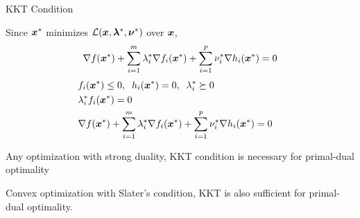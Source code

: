 \documentclass[handout,fleqn,aspectratio=169]{beamer}
\begin{document}
\begin{frame}{KKT Condition}

\plitemsep 0.05in
\bci 

\item Since $\bm{x}^{*}$ minimizes ${\cal L}(\bm{x},\bm{\lambda}^{*},\bm{\nu}^{*})$ over $\bm{x}$, 
\[
\nabla f(\bm{x}^{*}) + \sum_{i=1}^{m}\lambda_{i}^{*}\nabla
f_{i}(\bm{x}^{*}) + \sum_{i=1}^{p}\nu_{i}^{*}\nabla h_{i}(\bm{x}^{*}) = 0
\]
\vspace{-0.3cm}
{
\vspace{-0.3cm}
\begin{eqnarray*}
& f_{i}(\bm{x}^{*})\leq 0, \;\; h_{i}(\bm{x}^{*})=0, \;\;
\lambda_{i}^{*}\succeq 0 & \\
& \lambda_{i}^{*}f_{i}(\bm{x}^{*}) = 0 &\\
& \nabla f(\bm{x}^{*}) + \sum_{i=1}^{m}\lambda_{i}^{*}\nabla f_{i}(\bm{x}^{*}) + \sum_{i=1}^{p}\nu_{i}^{*}\nabla h_{i}(\bm{x}^{*}) = 0 &
\end{eqnarray*}
\vspace{-0.3cm}
}

\item {\red Any} optimization  with strong duality, KKT condition is necessary for primal-dual optimality

\item {\red Convex} optimization with Slater's condition, KKT is
also {\red sufficient} for primal-dual optimality. 

\eci

\end{frame}
\end{document}
